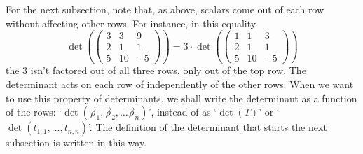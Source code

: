 For the next subsection, note that, as above, scalars come out
of each row without affecting other rows.
For instance, in this equality
\begin{equation*}
    \det(
      \begin{pmatrix}
        3  &3  &9  \\
        2  &1  &1  \\
        5  &10 &-5
     \end{pmatrix}
    )
    =3 \cdot \det(
               \begin{pmatrix}
                 1  &1  &3  \\
                 2  &1  &1  \\
                 5  &10 &-5
               \end{pmatrix}
             )                                  
\end{equation*}
the $3$ isn't factored out of all three rows, only out of the top row.
The determinant acts on each row of independently of the
other rows.
When we want to use this property of determinants, we shall 
write the determinant as a function of the rows:
`\( \det (\vec{\rho}_1,\vec{\rho}_2,\dots\vec{\rho}_n) \)', instead of
as `\( \det(T) \)'
or `\( \det(t_{1,1},\dots,t_{n,n}) \)'.
The definition of the determinant that starts the next subsection is written
in this way.


